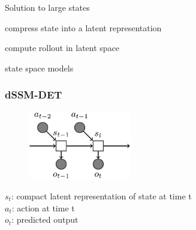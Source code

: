 \begin{frame}{Solution to large states}
	\begin{PraesentationAufzaehlung}
	    \item compress state into a latent representation
	    \item compute rollout in latent space
	\end{PraesentationAufzaehlung}
\end{frame}


\begin{frame}

\begin{PraesentationAufzaehlung}
    \item state space models
    \item 
    \item 
\end{PraesentationAufzaehlung}

\end{frame}
\clearpage



\begin{frame}
	\frametitle{dSSM-DET}
	\begin{multicols}{2}
		\begin{figure}[h]
			\includegraphics[width=0.4\textwidth]{./latent_i2a_images/dSSM_DET_architecture.png}	
		\end{figure}
		\columnbreak
		$s_t$: compact latent representation of state at time t\\
		$a_t$: action at time t\\
		$o_t$: predicted output
	\end{multicols}
\end{frame}

